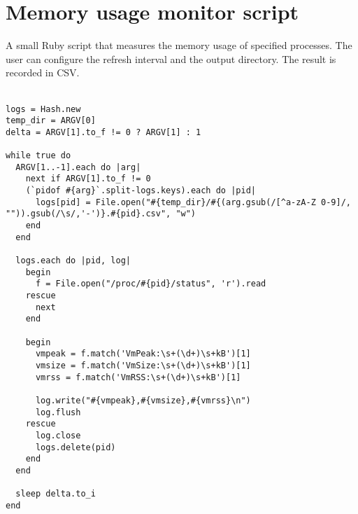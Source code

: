 \chapter{Memory usage monitor script} %
\label{ap:ruby19_encoding_patch}

A small Ruby script that measures the memory usage of specified processes. The user can configure the refresh interval and the output directory. The result is recorded in CSV.\\\\

\begin{lstlisting}
logs = Hash.new
temp_dir = ARGV[0]
delta = ARGV[1].to_f != 0 ? ARGV[1] : 1

while true do
  ARGV[1..-1].each do |arg|
    next if ARGV[1].to_f != 0
    (`pidof #{arg}`.split-logs.keys).each do |pid|
      logs[pid] = File.open("#{temp_dir}/#{(arg.gsub(/[^a-zA-Z 0-9]/, "")).gsub(/\s/,'-')}.#{pid}.csv", "w")
    end
  end

  logs.each do |pid, log|
    begin
      f = File.open("/proc/#{pid}/status", 'r').read
    rescue
      next
    end
    
    begin
      vmpeak = f.match('VmPeak:\s+(\d+)\s+kB')[1]
      vmsize = f.match('VmSize:\s+(\d+)\s+kB')[1]
      vmrss = f.match('VmRSS:\s+(\d+)\s+kB')[1]

      log.write("#{vmpeak},#{vmsize},#{vmrss}\n")
      log.flush
    rescue
      log.close
      logs.delete(pid)
    end
  end
  
  sleep delta.to_i
end
\end{lstlisting}
